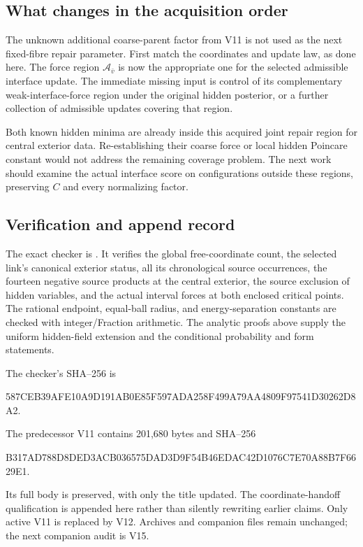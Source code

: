 \documentclass[11pt,oneside]{article}
\begin{document}
\subsection{What changes in the acquisition order}

The unknown additional coarse-parent factor
from V11 is not used as the next fixed-fibre
repair parameter. First match the coordinates
and update law, as done here. The force region
\(\mathcal A_{\bar v}\) is now the appropriate
one for the selected admissible interface
update. The immediate missing input is control
of its complementary weak-interface-force
region under the original hidden posterior,
or a further collection of admissible updates
covering that region.

Both known hidden minima are already inside
this acquired joint repair region for central
exterior data. Re-establishing their coarse
force or local hidden Poincare constant would
not address the remaining coverage problem.
The next work should examine the actual
interface score on configurations outside
these regions, preserving \(C\) and every
normalizing factor.

\subsection{Verification and append record}

The exact checker is
.
It verifies the global free-coordinate count,
the selected link's canonical exterior status,
all its chronological source occurrences,
the fourteen negative source products at the
central exterior, the source exclusion of
hidden variables, and the actual interval
forces at both enclosed critical points.
The rational endpoint, equal-ball radius,
and energy-separation constants are checked
with integer/Fraction arithmetic.
The analytic proofs above supply the
uniform hidden-field extension and the
conditional probability and form statements.

The checker's SHA--256 is
\begin{center}\scriptsize\ttfamily
587CEB39AFE10A9D191AB0E85F597ADA258F499A79AA4809F97541D30262D8A2.
\end{center}
The predecessor V11 contains 201,680 bytes
and SHA--256
\begin{center}\scriptsize\ttfamily
B317AD788D8DED3ACB036575DAD3D9F54B46EDAC42D1076C7E70A88B7F6629E1.
\end{center}
Its full body is preserved, with only the
title updated. The coordinate-handoff
qualification is appended here rather than
silently rewriting earlier claims. Only
active V11 is replaced by V12. Archives and
companion files remain unchanged; the next
companion audit is V15.
\end{document}
